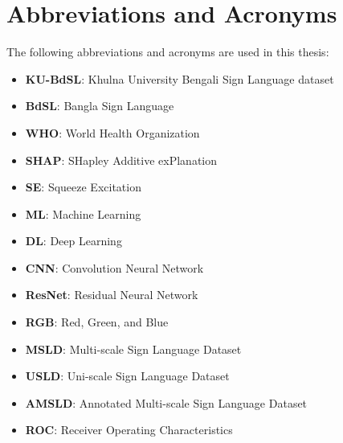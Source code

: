\chapter*{Abbreviations and Acronyms}

\begin{SingleSpace}
\large The following abbreviations and acronyms are used in this thesis: 
\vspace{5mm}

\begin{itemize}
    \item \textbf{KU-BdSL}: Khulna University Bengali Sign Language dataset
    \item \textbf{BdSL}: Bangla Sign Language
    \item \textbf{WHO}: World Health Organization
    \item \textbf{SHAP}: SHapley Additive exPlanation
    \item \textbf{SE}: Squeeze Excitation
    \item \textbf{ML}: Machine Learning
    \item \textbf{DL}: Deep Learning
    \item \textbf{CNN}: Convolution Neural Network
    \item \textbf{ResNet}: Residual Neural Network
    \item \textbf{RGB}: Red, Green, and Blue
    \item  \textbf{MSLD}: Multi-scale Sign Language Dataset
    \item  \textbf{USLD}: Uni-scale Sign Language Dataset
    \item  \textbf{AMSLD}: Annotated Multi-scale Sign Language Dataset
    \item \textbf{ROC}: Receiver Operating Characteristics
\end{itemize}

\end{SingleSpace}
\clearpage
